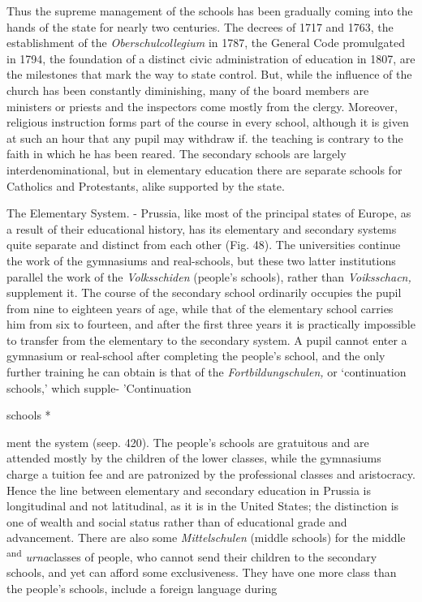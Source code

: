 \documentclass[]{book}
\begin{document}
Thus the supreme management of the schools has been gradually coming into the hands of the state for nearly two centuries. The decrees of 1717 and 1763, the establishment of the \emph{Oberschulcollegium} in 1787, the General Code promulgated in 1794, the foundation of a distinct civic administration of education in 1807, are the milestones that mark the way to state control. But, while the influence of the church has been constantly diminishing, many of the board members are ministers or priests and the inspectors come mostly from the clergy. Moreover, religious instruction forms part of the course in every school, although it is given at such an hour that any pupil may withdraw if. the teaching is contrary to the faith in which he has been reared. The secondary schools are largely interdenominational, but in elementary education there are separate schools\protect\hypertarget{ch25.xmlux5cux23para.452.1.0.box.111.220.1047.88.q.70}{}{ for Catholics and Protestants, alike supported by the state.}

The Elementary System. - Prussia, like most of the principal states of Europe, as a result of their educational history, has its elementary and secondary systems quite separate and distinct from each other (Fig. 48). The universities continue the work of the gymnasiums and real-schools, but these two latter institutions parallel the work of the \emph{Volksschiden} (people's schools), rather than \emph{Voiksschacn,} supplement it. The course of the secondary school ordinarily occupies the pupil from nine to eighteen years of age, while that of the elementary school carries him from six to fourteen, and after the first three years it is practically impossible to transfer from the elementary to the secondary system. A pupil cannot enter a gymnasium or real-school after completing the people's school, and the only further training he can obtain is that of the \emph{Fortbildungschulen,} or `continuation schools,' which supple- 'Continuation

schools *

ment the system (seep. 420). The people's schools are gratuitous and are attended mostly by the children of the lower classes, while the gymnasiums charge a tuition fee and are patronized by the professional classes and aristocracy. Hence the line between elementary and secondary education in Prussia is longitudinal and not latitudinal, as it is in the United States; the distinction is one of wealth and social status rather than of educational grade and advancement. There are also some \emph{Mittelschulen} (middle schools) for the middle \textsuperscript{and} \emph{urna}classes of people, who cannot send their children to the secondary schools, and yet can afford some exclusiveness. They have one more class than the people's schools, include a foreign language during
\end{document}

